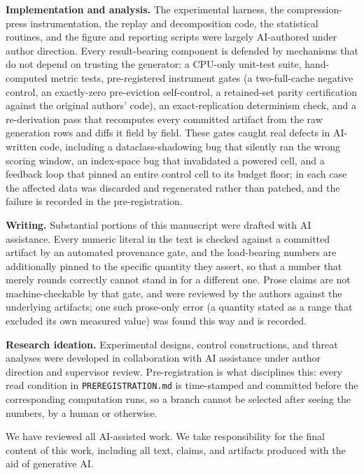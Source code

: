 \documentclass{article}
\begin{document}
\textbf{Implementation and analysis.} The experimental harness, the compression-press instrumentation, the replay and decomposition code, the statistical routines, and the figure and reporting scripts were largely AI-authored under author direction. Every result-bearing component is defended by mechanisms that do not depend on trusting the generator: a CPU-only unit-test suite, hand-computed metric tests, pre-registered instrument gates (a two-full-cache negative control, an exactly-zero pre-eviction self-control, a retained-set parity certification against the original authors' code), an exact-replication determinism check, and a re-derivation pass that recomputes every committed artifact from the raw generation rows and diffs it field by field. These gates caught real defects in AI-written code, including a dataclass-shadowing bug that silently ran the wrong scoring window, an index-space bug that invalidated a powered cell, and a feedback loop that pinned an entire control cell to its budget floor; in each case the affected data was discarded and regenerated rather than patched, and the failure is recorded in the pre-registration.

\textbf{Writing.} Substantial portions of this manuscript were drafted with AI assistance. Every numeric literal in the text is checked against a committed artifact by an automated provenance gate, and the load-bearing numbers are additionally pinned to the specific quantity they assert, so that a number that merely rounds correctly cannot stand in for a different one. Prose claims are not machine-checkable by that gate, and were reviewed by the authors against the underlying artifacts; one such prose-only error (a quantity stated as a range that excluded its own measured value) was found this way and is recorded.

\textbf{Research ideation.} Experimental designs, control constructions, and threat analyses were developed in collaboration with AI assistance under author direction and supervisor review. Pre-registration is what disciplines this: every read condition in \texttt{PREREGISTRATION.md} is time-stamped and committed before the corresponding computation runs, so a branch cannot be selected after seeing the numbers, by a human or otherwise.

We have reviewed all AI-assisted work. We take responsibility for the final content of this work, including all text, claims, and artifacts produced with the aid of generative AI.
\end{document}

